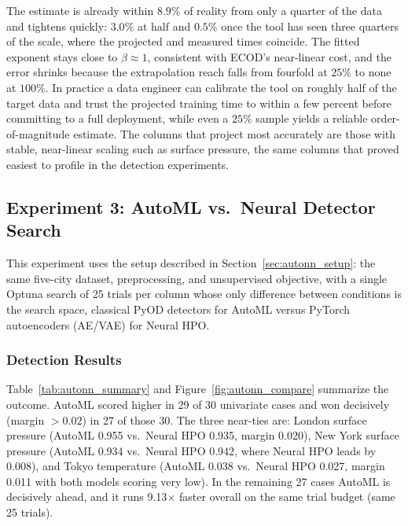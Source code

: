 \documentclass[12pt]{article}
\begin{document}
The estimate is already within $8.9\%$ of reality from only a quarter of the data and tightens quickly: $3.0\%$ at half and $0.5\%$ once the tool has seen three quarters of the scale, where the projected and measured times coincide. The fitted exponent stays close to $\beta\approx 1$, consistent with ECOD's near-linear cost, and the error shrinks because the extrapolation reach falls from fourfold at $25\%$ to none at $100\%$. In practice a data engineer can calibrate the tool on roughly half of the target data and trust the projected training time to within a few percent before committing to a full deployment, while even a $25\%$ sample yields a reliable order-of-magnitude estimate. The columns that project most accurately are those with stable, near-linear scaling such as surface pressure, the same columns that proved easiest to profile in the detection experiments.

\subsection{Experiment 3: AutoML vs.\ Neural Detector Search}\label{sec:autonn_comparison}

This experiment uses the setup described in Section~\ref{sec:autonn_setup}: the same five-city dataset, preprocessing, and unsupervised objective, with a single Optuna search of 25 trials per column whose only difference between conditions is the search space, classical PyOD detectors for AutoML versus PyTorch autoencoders (AE/VAE) for Neural HPO.

\subsubsection{Detection Results}

Table~\ref{tab:autonn_summary} and Figure~\ref{fig:autonn_compare} summarize the outcome. AutoML scored higher in 29 of 30 univariate cases and won decisively (margin $> 0.02$) in 27 of those 30. The three near-ties are: London surface pressure (AutoML 0.955 vs.\ Neural HPO 0.935, margin 0.020), New York surface pressure (AutoML 0.934 vs.\ Neural HPO 0.942, where Neural HPO leads by 0.008), and Tokyo temperature (AutoML 0.038 vs.\ Neural HPO 0.027, margin 0.011 with both models scoring very low). In the remaining 27 cases AutoML is decisively ahead, and it runs 9.13$\times$ faster overall on the same trial budget (same 25 trials).
\end{document}
